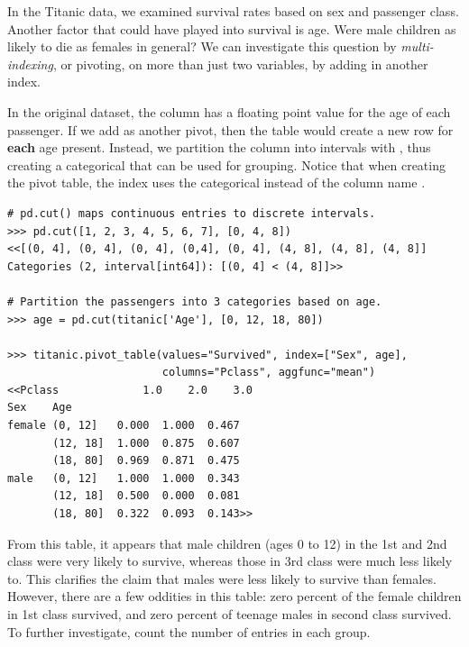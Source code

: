 In the Titanic data, we examined survival rates based on sex and passenger class.
Another factor that could have played into survival is age.
Were male children as likely to die as females in general?
We can investigate this question by \emph{multi-indexing}, or pivoting, on more than just two variables, by adding in another index.

In the original dataset, the  column has a floating point value for the age of each passenger.
If we add  as another pivot, then the table would create a new row for \textbf{each} age present.
Instead, we partition the  column into intervals with , thus creating a categorical that can be used for grouping.
Notice that when creating the pivot table, the index uses the categorical  instead of the column name .


\begin{lstlisting}
# pd.cut() maps continuous entries to discrete intervals.
>>> pd.cut([1, 2, 3, 4, 5, 6, 7], [0, 4, 8])
<<[(0, 4], (0, 4], (0, 4], (0,4], (0, 4], (4, 8], (4, 8], (4, 8]]
Categories (2, interval[int64]): [(0, 4] < (4, 8]]>>

# Partition the passengers into 3 categories based on age.
>>> age = pd.cut(titanic['Age'], [0, 12, 18, 80])

>>> titanic.pivot_table(values="Survived", index=["Sex", age],
                        columns="Pclass", aggfunc="mean")
<<Pclass             1.0    2.0    3.0
Sex    Age
female (0, 12]   0.000  1.000  0.467
       (12, 18]  1.000  0.875  0.607
       (18, 80]  0.969  0.871  0.475
male   (0, 12]   1.000  1.000  0.343
       (12, 18]  0.500  0.000  0.081
       (18, 80]  0.322  0.093  0.143>>
\end{lstlisting}

From this table, it appears that male children (ages 0 to 12) in the 1st and 2nd class were very likely to survive, whereas those in 3rd class were much less likely to.
This clarifies the claim that males were less likely to survive than females.
However, there are a few oddities in this table: zero percent of the female children in 1st class survived, and zero percent of teenage males in second class survived.
To further investigate, count the number of entries in each group.

%

